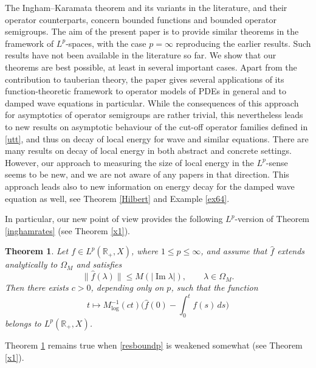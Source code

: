 \documentclass[11pt]{amsart}
\newtheorem{theorem}{Theorem}[section]
\theoremstyle{definition}
\theoremstyle{remark}
\numberwithin{equation}{section}
\begin{document}
The Ingham--Karamata theorem and its variants in the literature, and their operator counterparts, concern bounded functions and bound\-ed operator semigroups.   The aim of the present paper is to provide similar theorems in the framework of $L^p$-spaces, with the case $p =\infty$ reproducing the earlier results. Such results have not been available in the
literature so far.  We show that our theorems are best possible,
at least in several important cases.  Apart from the contribution to tauberian theory, the paper gives several applications of its function-theoretic framework to operator models of PDEs in general and to damped wave equations in particular.  While the consequences of this approach for asymptotics of operator semigroups are rather trivial, this nevertheless leads to new results on asymptotic behaviour of the cut-off operator families defined in \eqref{utt}, and thus on decay of local energy for wave and similar equations.  There are many results on decay of local energy in both abstract and concrete settings. However, our approach to measuring the size of local energy in the $L^p$-sense seems to be new, and we are not aware of any papers in that direction.  This approach leads also to new information on energy decay for the damped wave equation as well, see Theorem \ref{Hilbert} and Example \ref{ex64}.

In particular, our new point of view provides the following $L^p$-version of Theorem \ref{inghamrates} (see Theorem \ref{x1}).

\begin{theorem}  \label{x0}
Let $f \in L^p(\mathbb R_+,X)$, where $1 \le p \le \infty$, and assume that $\widehat f$ extends analytically to $\Omega_M$ and satisfies
\begin{equation} \label{resboundp}
\|\widehat f(\lambda)\|\le M(|{\operatorname{Im}} \lambda |), \qquad \lambda \in \Omega_M.
\end{equation}
Then there exists $c>0$, depending only on $p$,  such that the function
\begin{equation*} \label{Mlogestp}
t \mapsto M_{\log}^{-1} (ct) \Big(\widehat f (0)-\int_{0}^{t}f(s)\,ds \Big)
\end{equation*}
belongs to $L^p({{\mathbb R}}_+,X)$.
\end{theorem}

Theorem \ref{x0} remains true when \eqref{resboundp} is weakened somewhat (see Theorem \ref{x1}).
\end{document}
